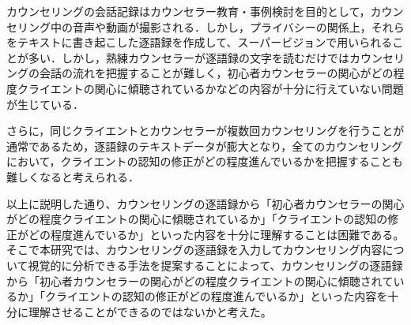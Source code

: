 \documentclass[shuuron]{kuee}
\begin{document}


カウンセリングの会話記録はカウンセラー教育・事例検討を目的として，カウンセリング中の音声や動画が撮影される．しかし，プライバシーの関係上，それらをテキストに書き起こした逐語録を作成して、スーパービジョンで用いられることが多い．しかし，熟練カウンセラーが逐語録の文字を読むだけではカウンセリングの会話の流れを把握することが難しく，初心者カウンセラーの関心がどの程度クライエントの関心に傾聴されているかなどの内容が十分に行えていない問題が生じている．


さらに，同じクライエントとカウンセラーが複数回カウンセリングを行うことが通常であるため，逐語録のテキストデータが膨大となり，全てのカウンセリングにおいて，クライエントの認知の修正がどの程度進んでいるかを把握することも難しくなると考えられる．%


以上に説明した通り、カウンセリングの逐語録から「初心者カウンセラーの関心がどの程度クライエントの関心に傾聴されているか」「クライエントの認知の修正がどの程度進んでいるか」といった内容を十分に理解することは困難である。そこで本研究では、カウンセリングの逐語録を入力してカウンセリング内容について視覚的に分析できる手法を提案することによって、カウンセリングの逐語録から「初心者カウンセラーの関心がどの程度クライエントの関心に傾聴されているか」「クライエントの認知の修正がどの程度進んでいるか」といった内容を十分に理解させることができるのではないかと考えた。
\end{document}

